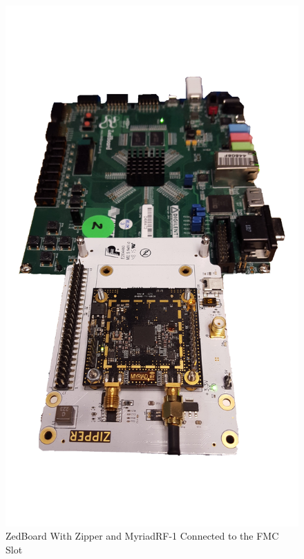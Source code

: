 \begin{appendices}
\begin{figure}[ht]
	\centerline{\includegraphics[scale=0.05]{zed_zipper}}
	\caption{ZedBoard With Zipper and MyriadRF-1 Connected to the FMC Slot}
	\label{fig:zed_zipper}
\end{figure}

\end{appendices}


